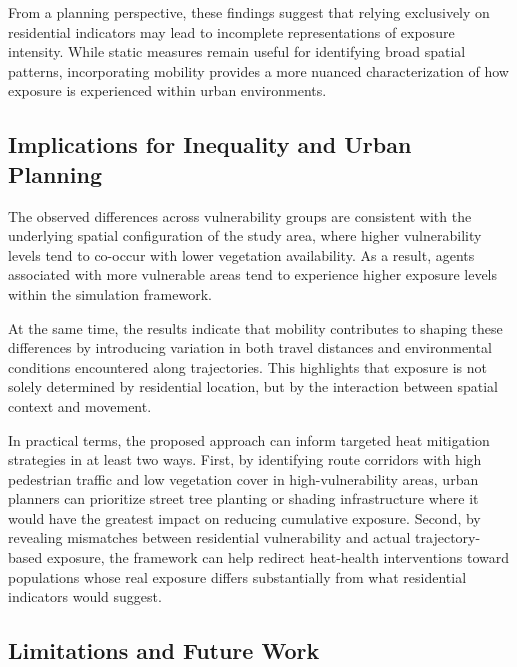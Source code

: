 \documentclass{wscpaperproc}
\theoremstyle{wsc}
\begin{document}
From a planning perspective, these findings suggest that relying exclusively on residential indicators may lead to incomplete representations of exposure intensity. While static measures remain useful for identifying broad spatial patterns, incorporating mobility provides a more nuanced characterization of how exposure is experienced within urban environments.

\subsection{Implications for Inequality and Urban Planning}

The observed differences across vulnerability groups are consistent with the underlying spatial configuration of the study area, where higher vulnerability levels tend to co-occur with lower vegetation availability. As a result, agents associated with more vulnerable areas tend to experience higher exposure levels within the simulation framework.

At the same time, the results indicate that mobility contributes to shaping these differences by introducing variation in both travel distances and environmental conditions encountered along trajectories. This highlights that exposure is not solely determined by residential location, but by the interaction between spatial context and movement.

In practical terms, the proposed approach can inform targeted heat mitigation strategies in at least two ways. First, by identifying route corridors with high pedestrian traffic and low vegetation cover in high-vulnerability areas, urban planners can prioritize street tree planting or shading infrastructure where it would have the greatest impact on reducing cumulative exposure. Second, by revealing mismatches between residential vulnerability and actual trajectory-based exposure, the framework can help redirect heat-health interventions toward populations whose real exposure differs substantially from what residential indicators would suggest.

\subsection{Limitations and Future Work}
\end{document}
